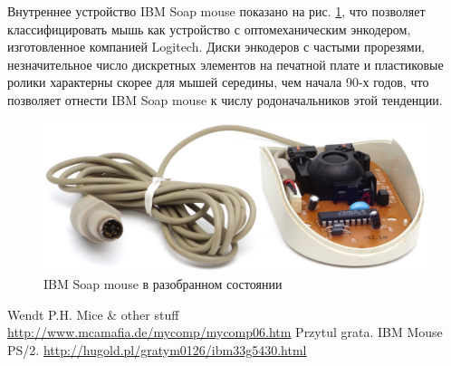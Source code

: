 \documentclass[11pt, a4paper]{article}
\begin{document}
Внутреннее устройство IBM Soap mouse показано на рис. \ref{fig:IBMSoapInside}, что позволяет классифицировать мышь как устройство с оптомеханическим энкодером, изготовленное компанией Logitech. Диски энкодеров с частыми прорезями, незначительное число дискретных элементов на печатной плате и пластиковые ролики характерны скорее для мышей середины, чем начала 90-х годов, что позволяет отнести IBM Soap mouse к числу родоначальников этой тенденции.

\begin{figure}[h]
    \centering
    \includegraphics[scale=0.7]{1992_ibm_soap_mouse/inside_60.jpg} 
    \caption{IBM Soap mouse в разобранном состоянии}
    \label{fig:IBMSoapInside}
\end{figure}

\begin{thebibliography}{9}
 Wendt P.H. Mice \& other stuff \url{http://www.mcamafia.de/mycomp/mycomp06.htm}
 Przytul grata. IBM Mouse PS/2. \url{http://hugold.pl/gratym0126/ibm33g5430.html}
\end{thebibliography}
\end{document}
